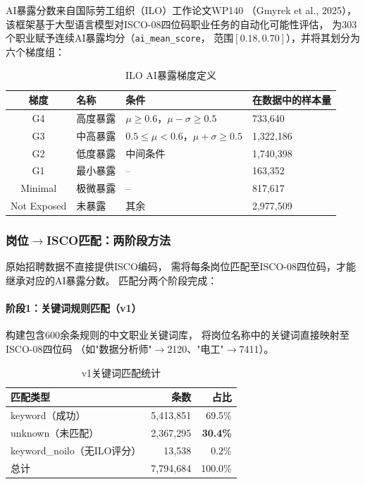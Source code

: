 \documentclass[12pt,a4paper]{ctexart}
\begin{document}
AI暴露分数来自国际劳工组织（ILO）工作论文WP140
（Gmyrek et al., 2025），
该框架基于大型语言模型对ISCO-08四位码职业任务的自动化可能性评估，
为303个职业赋予连续AI暴露均分（\texttt{ai\_mean\_score}，
范围$[0.18, 0.70]$），并将其划分为六个梯度组：

\begin{table}[h!]
\centering
\caption{ILO AI暴露梯度定义}
\small
\begin{tabular}{clll}
\toprule
梯度 & 名称 & 条件 & 在数据中的样本量 \\
\midrule
G4 & 高度暴露 & $\mu \geq 0.6$，$\mu - \sigma \geq 0.5$ & 733,640 \\
G3 & 中高暴露 & $0.5 \leq \mu < 0.6$，$\mu + \sigma \geq 0.5$ & 1,322,186 \\
G2 & 低度暴露 & 中间条件 & 1,740,398 \\
G1 & 最小暴露 & -- & 163,352 \\
Minimal & 极微暴露 & -- & 817,617 \\
Not Exposed & 未暴露 & 其余 & 2,977,509 \\
\bottomrule
\end{tabular}
\end{table}

\subsubsection{岗位$\to$ISCO匹配：两阶段方法}

原始招聘数据不直接提供ISCO编码，
需将每条岗位匹配至ISCO-08四位码，才能继承对应的AI暴露分数。
匹配分两个阶段完成：

\paragraph{阶段1：关键词规则匹配（v1）}

构建包含600余条规则的中文职业关键词库，
将岗位名称中的关键词直接映射至ISCO-08四位码
（如"数据分析师"$\to$2120、"电工"$\to$7411）。

\begin{table}[h!]
\centering
\caption{v1关键词匹配统计}
\begin{tabular}{lrr}
\toprule
匹配类型 & 条数 & 占比 \\
\midrule
keyword（成功） & 5,413,851 & 69.5\% \\
unknown（未匹配） & 2,367,295 & \textbf{30.4\%} \\
keyword\_noilo（无ILO评分） & 13,538 & 0.2\% \\
\midrule
总计 & 7,794,684 & 100.0\% \\
\bottomrule
\end{tabular}
\end{table}
\end{document}
